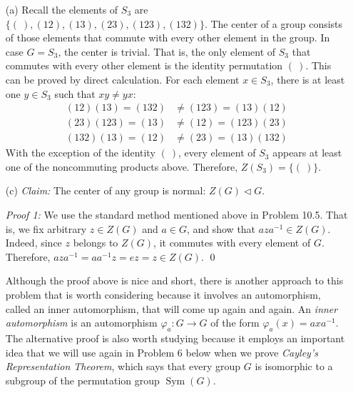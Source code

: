 \documentclass[12pt,reqno]{amsart}
\newcommand{\<}{\ensuremath{\langle}}
\renewcommand{\>}{\ensuremath{\rangle}}
\newcommand{\Sym}{\ensuremath{\operatorname{Sym}}}
\begin{document}
\begin{enumerate}
\begin{enumerate}
 \item[(a)]
Recall the elements of $S_3$ are 
$\{(~), (12), (13), (23), (123), (132)\}$.
The center of a group consists of those elements that commute with
every other element in the group. In case $G = S_3$, the center is trivial.
That is, the only element of $S_3$ that commutes with every other element is the
identity permutation $(~)$.  This can be proved by direct calculation. For each
element $x \in S_3$, there is at least one $y\in S_3$ such that $xy \neq yx$: 
\begin{align*}
  (12)(13) = (132) %
  &\neq (123) = (13)(12)\\[4pt]
  (23)(123) = (13) %
  &\neq (12) = (123)(23)\\[4pt]
  (132)(13) = (12) %
  &\neq (23) = (13)(132)
\end{align*}
With the exception of the identity $(~)$, every element of $S_3$ appears at least
one of the noncommuting products above.  Therefore, $Z(S_3) = \{(~)\}$.

\medskip
 
 \item[(c)]
\emph{Claim:} The center of any group is normal: $Z(G) \triangleleft G$.

\smallskip

\noindent
\emph{Proof 1:}
We use the standard method mentioned above in Problem 10.5.  That is, we fix
arbitrary $z \in Z(G)$ and $a \in G$, and show that $aza^{-1} \in Z(G)$.
Indeed, since $z$ belongs to  $Z(G)$, it commutes with every element of $G$.
Therefore, $aza^{-1} = aa^{-1}z = e z  = z\in Z(G)$.
\qed

\medskip
Although the proof above is nice and short, there is another approach to this
problem that is worth considering because it involves an automorphism,
called an inner automorphism, that will come up again and again. An 
\emph{inner automorphism} is an automorphism $\varphi_a: G \rightarrow G$ of the
form $\varphi_a(x) = axa^{-1}$.  The alternative proof  is also worth studying
because it employs an important idea that we will use again in Problem 6 below
when we prove \emph{Cayley's Representation Theorem}, which says that
every group $G$ is isomorphic to a subgroup of the permutation group $\Sym(G)$.

\medskip


\end{enumerate}
\end{enumerate}
\end{document}
